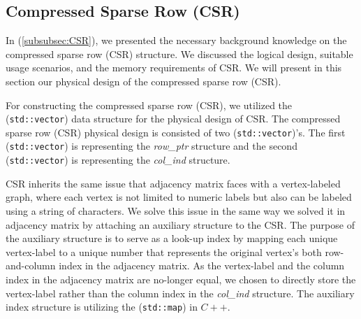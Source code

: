 {\subsection{Compressed Sparse Row (CSR)}
\label{subsec:PhyDesign-CSR}

In (\ref{subsubsec:CSR}), we presented the necessary background knowledge on the compressed sparse row (CSR) structure. We discussed the logical design, suitable usage scenarios, and the memory requirements of CSR. We will present in this section our physical design of the compressed sparse row (CSR).



For constructing the compressed sparse row (CSR), we utilized the (\texttt{std::vector}) data structure for the physical design of CSR. The compressed sparse row (CSR) physical design is consisted of two (\texttt{std::vector})'s. The first (\texttt{std::vector}) is representing the \textit{row\_ptr} structure and the second (\texttt{std::vector}) is representing the \textit{col\_ind} structure.

CSR inherits the same issue that adjacency matrix faces with a vertex-labeled graph, where each vertex is not limited to numeric labels but also can be labeled using a string of characters. We solve this issue in the same way we solved it in adjacency matrix by attaching an auxiliary structure to the CSR. The purpose of the auxiliary structure is to serve as a look-up index by mapping each unique vertex-label to a unique number that represents the original vertex's both row-and-column index in the adjacency matrix. As the vertex-label and the column index in the adjacency matrix are no-longer equal, we chosen to directly store the vertex-label rather than the column index in the \textit{col\_ind} structure. The auxiliary index structure is utilizing the (\texttt{std::map}) in $C++$.

}

